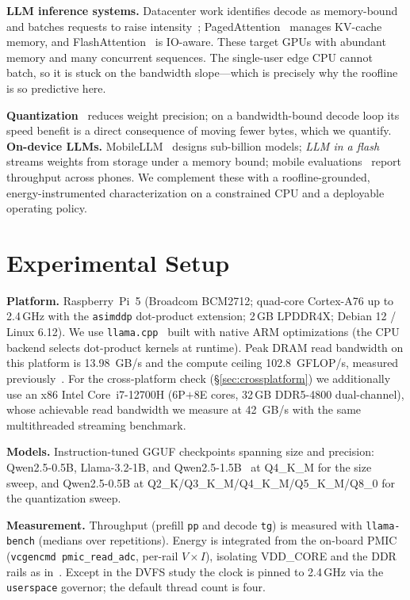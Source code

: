 \documentclass[10pt,journal,compsoc]{IEEEtran}
\begin{document}
\textbf{LLM inference systems.} Datacenter work identifies decode as memory-bound and batches
requests to raise intensity~\cite{pope2023efficiently}; PagedAttention~\cite{kwon2023vllm} manages
KV-cache memory, and FlashAttention~\cite{dao2022flashattention} is IO-aware. These target GPUs
with abundant memory and many concurrent sequences. The single-user edge CPU cannot batch, so it
is stuck on the bandwidth slope---which is precisely why the roofline is so predictive here.

\textbf{Quantization}~\cite{dettmers2022llmint8,frantar2023gptq,lin2024awq} reduces weight
precision; on a bandwidth-bound decode loop its speed benefit is a direct consequence of moving
fewer bytes, which we quantify. \textbf{On-device LLMs.} MobileLLM~\cite{liu2024mobilellm} designs
sub-billion models; \emph{LLM in a flash}~\cite{alizadeh2024llmflash} streams weights from storage
under a memory bound; mobile evaluations~\cite{laskaridis2024mobilellm} report throughput across
phones. We complement these with a roofline-grounded, energy-instrumented characterization on a
constrained CPU and a deployable operating policy.

\section{Experimental Setup}\label{sec:setup}
\textbf{Platform.} Raspberry~Pi~5 (Broadcom BCM2712; quad-core Cortex-A76 up to 2.4\,GHz with the
\texttt{asimddp} dot-product extension; 2\,GB LPDDR4X; Debian 12 / Linux 6.12). We use
\texttt{llama.cpp}~\cite{llamacpp} built with native ARM optimizations (the CPU backend selects
dot-product kernels at runtime). Peak DRAM read bandwidth on this platform is \SI{13.98}{GB/s} and
the compute ceiling \SI{102.8}{GFLOP/s}, measured previously~\cite{jacob2026memwall}. For the
cross-platform check (\S\ref{sec:crossplatform}) we additionally use an x86 Intel Core~i7-12700H
(6P$+$8E cores, 32\,GB DDR5-4800 dual-channel), whose achievable read bandwidth we measure at
\SI{42}{GB/s} with the same multithreaded streaming benchmark.

\textbf{Models.} Instruction-tuned GGUF checkpoints spanning size and precision: Qwen2.5-0.5B,
Llama-3.2-1B, and Qwen2.5-1.5B~\cite{qwen2025,llama32} at Q4\_K\_M for the size sweep, and
Qwen2.5-0.5B at Q2\_K/Q3\_K\_M/Q4\_K\_M/Q5\_K\_M/Q8\_0 for the quantization sweep.

\textbf{Measurement.} Throughput (prefill \texttt{pp} and decode \texttt{tg}) is measured with
\texttt{llama-bench} (medians over repetitions). Energy is integrated from the on-board PMIC
(\texttt{vcgencmd pmic\_read\_adc}, per-rail $V\!\times\!I$), isolating VDD\_CORE and the DDR rails
as in~\cite{jacob2026energy}. Except in the DVFS study the clock is pinned to 2.4\,GHz via the
\texttt{userspace} governor; the default thread count is four.
\end{document}
